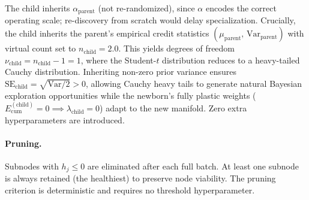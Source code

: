 \documentclass[11pt,a4paper]{article}
\theoremstyle{definition}
\begin{document}
The child inherits $\alpha_\text{parent}$ (not re-randomized), since $\alpha$ encodes the
correct operating scale; re-discovery from scratch would delay specialization.
Crucially, the child inherits the parent's empirical credit statistics $(\mu_\text{parent},\, \text{Var}_\text{parent})$ with virtual count set to $n_\text{child} = 2.0$.
This yields degrees of freedom $\nu_\text{child} = n_\text{child} - 1 = 1$, where the Student-$t$ distribution reduces to a heavy-tailed Cauchy distribution.
Inheriting non-zero prior variance ensures $\mathrm{SE}_\text{child} = \sqrt{\mathrm{Var} / 2} > 0$, allowing Cauchy heavy tails to generate natural Bayesian exploration opportunities while the newborn's fully plastic weights ($E_{\text{cum}}^{(\text{child})} = 0 \implies \lambda_{\text{child}} = 0$) adapt to the new manifold. Zero extra hyperparameters are introduced.

\paragraph{Pruning.}
Subnodes with $h_j \le 0$ are eliminated after each full batch.
At least one subnode is always retained (the healthiest) to preserve node viability.
The pruning criterion is deterministic and requires no threshold hyperparameter.
\end{document}
